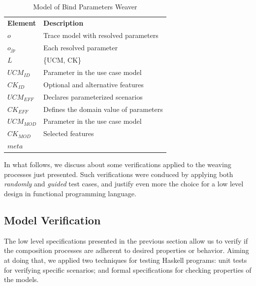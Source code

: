\documentclass{acm_proc_article-sp}
\begin{document}
\begin{table}[h]
\begin{center}
\caption{Model of Bind Parameters Weaver} \label{tab:bp-weaver}
\begin{tabular}{p{0.6in}p{2.4in}}
   \hline\noalign{\smallskip}
  {\bf Element} & {\bf Description} \\
   \noalign{\smallskip}
   \hline
   \noalign{\smallskip}
   $o$               & Trace model with resolved parameters  \\ 
   $o_{jp}$        & Each resolved parameter \\ 
   $L$               & \{UCM, CK\} \\ 
   $UCM_{ID}$ & Parameter in the use case model \\
   $CK_{ID}$    & Optional and alternative features \\ 
   $UCM_{EFF}$ & Declares parameterized scenarios \\
   $CK_{EFF}$    & Defines the domain value of parameters \\ 
   $UCM_{MOD}$ & Parameter in the use case model \\
   $CK_{MOD}$    & Selected features \\ 
   $meta$ &  \\ 
  \hline
  \end{tabular}
\end{center}
\end{table}

In what follows, we discuss about some verifications applied to the weaving processes just presented. 
Such verifications were conduced by applying both \emph{randomly} and \emph{guided} test cases, and 
justify even more the choice for a low level design in functional programming language. 

\subsection{Model Verification}

The low level specifications presented in the 
previous section allow us to verify if the composition 
processes are adherent to desired properties or behavior. 
Aiming at doing that, we applied two techniques for testing 
Haskell programs: unit tests for verifying specific scenarios; and 
formal specifications for checking properties of the models. 
\end{document}

